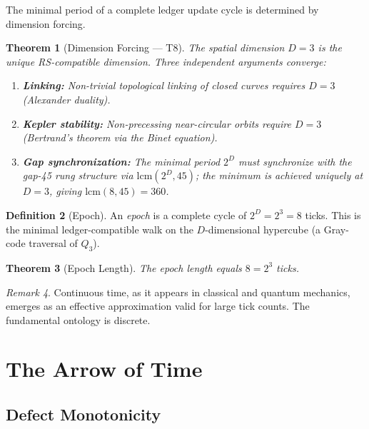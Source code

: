 \documentclass[12pt,a4paper]{article}
\newtheorem{theorem}{Theorem}[section]
\theoremstyle{definition}
\newtheorem{definition}[theorem]{Definition}
\theoremstyle{remark}
\newtheorem{remark}[theorem]{Remark}
\begin{document}
The minimal period of a complete ledger update cycle is determined by
dimension forcing.

\begin{theorem}[Dimension Forcing --- T8]
\label{thm:D3}
The spatial dimension $D = 3$ is the unique RS-compatible dimension.  Three
independent arguments converge:
\begin{enumerate}[label=(\roman*)]
  \item \textbf{Linking:} Non-trivial topological linking of closed curves
    requires $D = 3$ (Alexander duality).
  \item \textbf{Kepler stability:} Non-precessing near-circular orbits
    require $D = 3$ (Bertrand's theorem via the Binet equation).
  \item \textbf{Gap synchronization:} The minimal period $2^D$ must
    synchronize with the gap-45 rung structure via $\mathrm{lcm}(2^D, 45)$;
    the minimum is achieved uniquely at $D = 3$, giving
    $\mathrm{lcm}(8, 45) = 360$.
\end{enumerate}
\end{theorem}

\begin{definition}[Epoch]
\label{def:epoch}
An \emph{epoch} is a complete cycle of $2^D = 2^3 = 8$ ticks.  This is
the minimal ledger-compatible walk on the $D$-dimensional hypercube (a
Gray-code traversal of $Q_3$).
\end{definition}

\begin{theorem}[Epoch Length]
\label{thm:epoch}
The epoch length equals $8 = 2^3$ ticks.
\end{theorem}

\begin{remark}
Continuous time, as it appears in classical and quantum mechanics, emerges
as an effective approximation valid for large tick counts.  The fundamental
ontology is discrete.
\end{remark}

\section{The Arrow of Time}
\label{sec:arrow}

\subsection{Defect Monotonicity}
\end{document}
